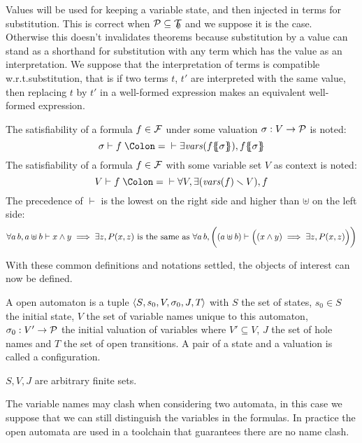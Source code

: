 \documentclass{article}
\begin{document}
Values will be used for keeping a variable state, and then injected in terms for substitution.
This is correct when \(\mathcal{P} \subseteq {\mathcal{T}}_{\!\!\emptyset}\) and we suppose it is the case.
Otherwise this doesn't invalidates theorems because substitution by a value can stand as a shorthand for substitution with any term which has the value as an interpretation.
We suppose that the interpretation of terms is compatible w.r.t.\@ substitution, that is if two terms \(t\), \(t'\) are interpreted with the same value, then replacing \(t\) by \(t'\) in a well-formed expression makes an equivalent well-formed expression.
\begin{noti}
 The satisfiability of a formula \(f \in {\mathcal{F}}\) under some valuation \(\sigma: V \to \mathcal{P}\) is noted:
\[ \sigma \vdash f \defnotation \vdash \exists \fvars{f\psubst{\sigma}}, f\psubst{\sigma} \]
 The satisfiability of a formula \(f \in {\mathcal{F}}\) with some variable set \(V\) as context is noted:
\[ V \vdash f \defnotation \vdash \forall V, \exists\mpar{\fvars{f} \setminus V}, f \]
 The precedence of \(\vdash\) is the lowest on the right side and higher than \(\uplus\) on the left side:
\[ \forall a \, b, a \uplus b \vdash x \wedge y \implies \exists z, P{\left(x,z\right)} \text{ is the same as } \forall a \, b, \bigg((a \uplus b) \vdash \Big((x \wedge y) \implies \exists z, P{\left(x,z\right)}\Big)\bigg) \]
\end{noti}
With these common definitions and notations settled, the objects of interest can now be defined.
\begin{defi}
A open automaton is a tuple \(\left<S_{},s_{0},V_{},\sigma_{0},J_{},T_{}\right>\) with \(S\) the set of states, \(s_0 \in S\) the initial state, \(V\) the set of variable names unique to this automaton, \(\sigma_0: V' \to \mathcal{P}\) the initial valuation of variables where \(V' \subseteq V\), \(J\) the set of hole names and \(T\) the set of open transitions.
A pair of a state and a valuation is called a configuration.

\(S, V, J\) are arbitrary finite sets. %
\end{defi}
The variable names may clash when considering two automata, in this case we suppose that we can still distinguish the variables in the formulas.
In practice the open automata are used in a toolchain that guarantees there are no name clash.
\end{document}
